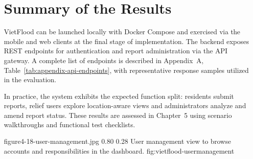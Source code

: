 \FloatBarrier
\section{Summary of the Results}

VietFlood can be launched locally with Docker Compose and exercised via the mobile and web clients at the final stage of implementation. The backend exposes REST endpoints for authentication and report administration via the API gateway. A complete list of endpoints is described in Appendix~A, Table~\ref{tab:appendix-api-endpoints}, with representative response samples utilized in the evaluation.

In practice, the system exhibits the expected function split: residents submit reports, relief users explore location-aware views and administrators analyze and amend report status. These results are assessed in Chapter~5 using scenario walkthroughs and functional test checklists.

\vfplaceholderfigure
{figure4-18-user-management.jpg}
{0.80}
{0.28}
{User management view to browse accounts and responsibilities in the dashboard.}
{fig:vietflood-usermanagement}

\FloatBarrier
\endgroup
